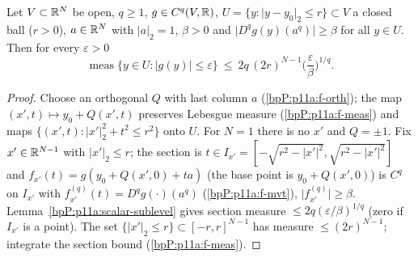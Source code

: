 \begin{lemma}\label{bpP:p11a:ball-sublevel}
Let $V\subset\mathbb{R}^N$ be open, $q\ge1$, $g\in C^q(V,\mathbb{R})$, $U=\{y:\lvert y-y_0\rvert_2\le r\}\subset V$ a closed ball ($r>0$), $a\in\mathbb{R}^N$ with $\lvert a\rvert_2=1$, $\beta>0$ and $\lvert D^qg(y)(a^q)\rvert\ge\beta$ for all $y\in U$. Then for every $\varepsilon>0$
\[\operatorname{meas}\{y\in U:\lvert g(y)\rvert\le\varepsilon\}\ \le\ 2q\,(2r)^{N-1}\Big(\frac\varepsilon\beta\Big)^{1/q}.\]
\end{lemma}
\begin{proof}
\label{stepP:p11a:bs-rot} Choose an orthogonal $Q$ with last column $a$ (\ref{bpP:p11a:f-orth}); the map $(x',t)\mapsto y_0+Q(x',t)$ preserves Lebesgue measure (\ref{bpP:p11a:f-meas}) and maps $\{(x',t):\lvert x'\rvert_2^2+t^2\le r^2\}$ onto $U$. For $N=1$ there is no $x'$ and $Q=\pm1$.
\label{stepP:p11a:bs-sections} Fix $x'\in\mathbb{R}^{N-1}$ with $\lvert x'\rvert_2\le r$; the section is $t\in I_{x'}=[-\sqrt{r^2-\lvert x'\rvert^2},\sqrt{r^2-\lvert x'\rvert^2}]$ and $f_{x'}(t)=g(y_0+Q(x',0)+ta)$ (the base point is $y_0+Q(x',0)$) is $C^q$ on $I_{x'}$ with $f_{x'}^{(q)}(t)=D^qg(\cdot)(a^q)$ (\ref{bpP:p11a:f-mvt}), $\lvert f^{(q)}_{x'}\rvert\ge\beta$. Lemma~\ref{bpP:p11a:scalar-sublevel} gives section measure $\le2q(\varepsilon/\beta)^{1/q}$ (zero if $I_{x'}$ is a point).
\label{stepP:p11a:bs-tonelli} The set $\{\lvert x'\rvert_2\le r\}\subset[-r,r]^{N-1}$ has measure $\le(2r)^{N-1}$; integrate the section bound (\ref{bpP:p11a:f-meas}).
\end{proof}

